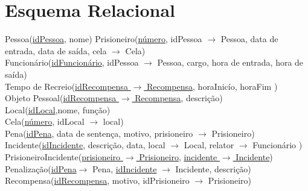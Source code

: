 \documentclass{article}
\begin{document}
\section{Esquema Relacional}
Pessoa(\underline{idPessoa}, nome)
Prisioneiro(\underline{número}, idPessoa $\rightarrow$ Pessoa, data de entrada, data de saída, cela $\rightarrow$ Cela)\\
Funcionário(\underline{idFuncionário}, idPessoa $\rightarrow$ Pessoa, cargo, hora de entrada, hora de saída)\\
Tempo de Recreio(\underline{idRecompensa $\rightarrow$ Recompensa}, horaInicío, horaFim )\\
Objeto Pessoal(\underline{idRecompensa $\rightarrow$ Recompensa}, descrição)\\
Local(\underline{idLocal},nome, função)\\
Cela(\underline{número}, idLocal $\rightarrow$ local)\\
Pena(\underline{idPena}, data de sentença, motivo, prisioneiro $\rightarrow$ Prisioneiro)\\
Incidente(\underline{idIncidente}, descrição, data, local $\rightarrow$ Local, relator $\rightarrow$ Funcionário )\\
PrisioneiroIncidente(\underline{prisioneiro $\rightarrow$ Prisioneiro}, \underline{incidente $\rightarrow$ Incidente})\\
Penalização(\underline{idPena}$\rightarrow$ Pena, \underline{idIncidente} $\rightarrow$ Incidente, descrição)\\
Recompensa(\underline{idRecompensa}, motivo, idPrisioneiro $\rightarrow$ Prisioneiro)\\








	
\end{document}
